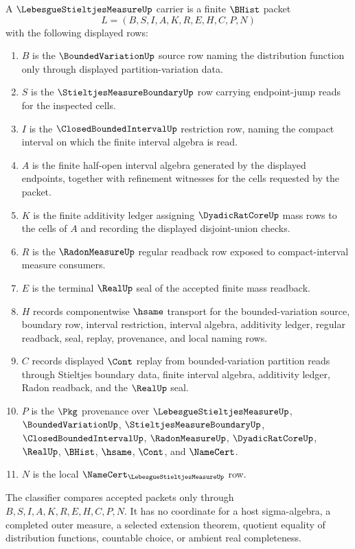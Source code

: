 \begin{definition}
\label{def:lebesgue-stieltjes-measure-carrier}
A $\LebesgueStieltjesMeasureUp$ carrier is a finite $\BHist$ packet
$$
L=(B,S,I,A,K,R,E,H,C,P,N)
$$
with the following displayed rows:
\begin{enumerate}
\item $B$ is the $\BoundedVariationUp$ source row naming the distribution function only through displayed partition-variation data.
\item $S$ is the $\StieltjesMeasureBoundaryUp$ row carrying endpoint-jump reads for the inspected cells.
\item $I$ is the $\ClosedBoundedIntervalUp$ restriction row, naming the compact interval on which the finite interval algebra is read.
\item $A$ is the finite half-open interval algebra generated by the displayed endpoints, together with refinement witnesses for the cells requested by the packet.
\item $K$ is the finite additivity ledger assigning $\DyadicRatCoreUp$ mass rows to the cells of $A$ and recording the displayed disjoint-union checks.
\item $R$ is the $\RadonMeasureUp$ regular readback row exposed to compact-interval measure consumers.
\item $E$ is the terminal $\RealUp$ seal of the accepted finite mass readback.
\item $H$ records componentwise $\hsame$ transport for the bounded-variation source, boundary row, interval restriction, interval algebra, additivity ledger, regular readback, seal, replay, provenance, and local naming rows.
\item $C$ records displayed $\Cont$ replay from bounded-variation partition reads through Stieltjes boundary data, finite interval algebra, additivity ledger, Radon readback, and the $\RealUp$ seal.
\item $P$ is the $\Pkg$ provenance over $\LebesgueStieltjesMeasureUp$, $\BoundedVariationUp$, $\StieltjesMeasureBoundaryUp$, $\ClosedBoundedIntervalUp$, $\RadonMeasureUp$, $\DyadicRatCoreUp$, $\RealUp$, $\BHist$, $\hsame$, $\Cont$, and $\NameCert$.
\item $N$ is the local $\NameCert_{\LebesgueStieltjesMeasureUp}$ row.
\end{enumerate}
The classifier compares accepted packets only through $B,S,I,A,K,R,E,H,C,P,N$. It has no coordinate for a host sigma-algebra, a completed outer measure, a selected extension theorem, quotient equality of distribution functions, countable choice, or ambient real completeness.
\end{definition}

